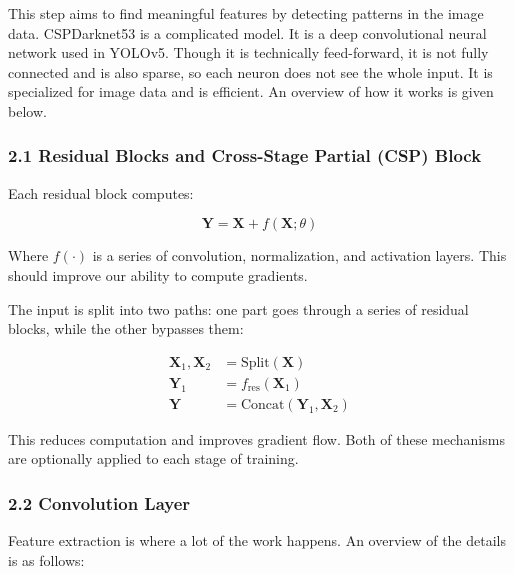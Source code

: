 \documentclass[11pt]{article}
\begin{document}
This step aims to find meaningful features by detecting patterns in the image data. CSPDarknet53 is a complicated model. It is a deep convolutional neural network used in YOLOv5. Though it is technically feed-forward, it is not fully connected and is also sparse, so each neuron does not see the whole input. It is specialized for image data and is efficient. An overview of how it works is given below. \cite{wang2020cspnet}

\subsubsection*{2.1 Residual Blocks and Cross-Stage Partial (CSP) Block}

Each residual block computes:

\[
\mathbf{Y} = \mathbf{X} + f(\mathbf{X}; \theta)
\]

Where $f(\cdot)$ is a series of convolution, normalization, and activation layers. This should improve our ability to compute gradients.

The input is split into two paths: one part goes through a series of residual blocks, while the other bypasses them:

\[
\begin{aligned}
\mathbf{X}_1, \mathbf{X}_2 &= \text{Split}(\mathbf{X}) \\
\mathbf{Y}_1 &= f_{\text{res}}(\mathbf{X}_1) \\
\mathbf{Y} &= \text{Concat}(\mathbf{Y}_1, \mathbf{X}_2)
\end{aligned}
\]

This reduces computation and improves gradient flow. Both of these mechanisms are optionally applied to each stage of training.

\subsubsection*{2.2 Convolution Layer}
Feature extraction is where a lot of the work happens. An overview of the details is as follows:
\end{document}
